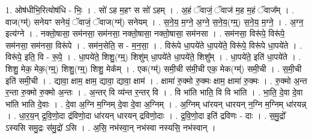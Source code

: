 \documentclass[17pt]{extarticle}
\begin{document}
1. ओष॑धीभि॒रित्योष॑धि - भिः॒ । . सो॑ ऽह म॒हꣳ स सो॑ ऽहम् । . अ॒हं ॅवाजं॒ ॅवाज॑ म॒ह म॒हं ॅवाज᳚म् । . वाज(ग्म्॑) सनेयꣳ सनेयं॒ ॅवाजं॒ ॅवाज(ग्म्॑) सनेयम् । . स॒ने॒य॒ म॒ग्ने॒ अ॒ग्ने॒ स॒ने॒य॒(ग्म्॒) स॒ने॒य॒ म॒ग्ने॒ । . अ॒ग्न॒ इत्य॑ग्ने । . नक्तो॒षासा॒ सम॑नसा॒ सम॑नसा॒ नक्तो॒षासा॒ नक्तो॒षासा॒ सम॑नसा । . सम॑नसा॒ विरू॑पे॒ विरू॑पे॒ सम॑नसा॒ सम॑नसा॒ विरू॑पे । . सम॑न॒सेति॒ स - म॒न॒सा॒ । . विरू॑पे धा॒पये॑ते धा॒पये॑ते॒ विरू॑पे॒ विरू॑पे धा॒पये॑ते । . विरू॑पे॒ इति॒ वि - रू॒पे॒ । . धा॒पये॑ते॒ शिशु॒(ग्म्॒) शिशु॑म् धा॒पये॑ते धा॒पये॑ते॒ शिशु᳚म् । . धा॒पये॑ते॒ इति॑ धा॒पये॑ते । . शिशु॒ मेक॒ मेक॒(ग्म्॒) शिशु॒(ग्म्॒) शिशु॒ मेक᳚म् । . एक(ग्म्॑) समी॒ची स॑मी॒ची एक॒ मेक(ग्म्॑) समी॒ची । . स॒मी॒ची इति॑ समी॒ची । . द्यावा॒ क्षाम॒ क्षाम॒ द्यावा॒ द्यावा॒ क्षाम॑ । . क्षामा॑ रु॒क्मो रु॒क्मः क्षाम॒ क्षामा॑ रु॒क्मः । . रु॒क्मो अ॒न्त र॒न्ता रु॒क्मो रु॒क्मो अ॒न्तः । . अ॒न्तर् वि व्य॑न्त र॒न्तर् वि । . वि भा॑ति भाति॒ वि वि भा॑ति । . भा॒ति॒ दे॒वा दे॒वा भा॑ति भाति दे॒वाः । . दे॒वा अ॒ग्नि म॒ग्निम् दे॒वा दे॒वा अ॒ग्निम् । . अ॒ग्निम् धा॑रयन् धारयन् न॒ग्नि म॒ग्निम् धा॑रयन्न् । . धा॒र॒य॒न् द्र॒वि॒णो॒दा द्र॑विणो॒दा धा॑रयन् धारयन् द्रविणो॒दाः । . द्र॒वि॒णो॒दा इति॑ द्रविणः - दाः । . स॒मु॒द्रो᳚ ऽस्यसि समु॒द्रः स॑मु॒द्रो॑ ऽसि । . अ॒सि॒ नभ॑स्वा॒न् नभ॑स्वा नस्यसि॒ नभ॑स्वान् । \newline
\end{document}
